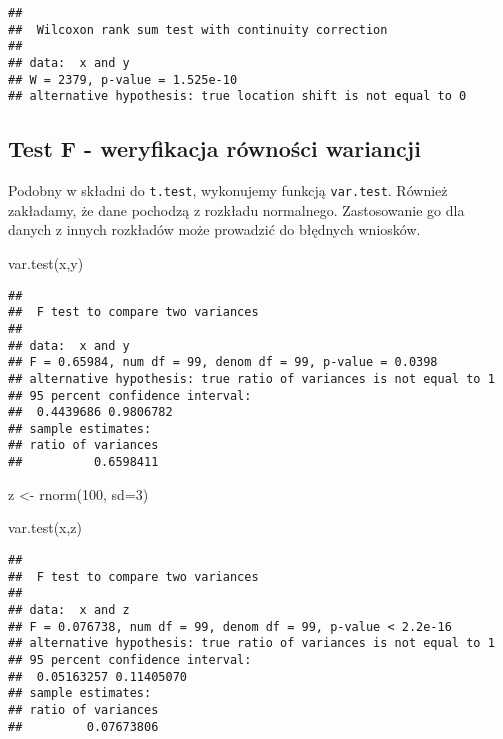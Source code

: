 \documentclass[
]{book}
\newenvironment{Shaded}{\begin{snugshade}}{\end{snugshade}}
\newcommand{\AttributeTok}[1]{\textcolor[rgb]{0.77,0.63,0.00}{#1}}
\newcommand{\DecValTok}[1]{\textcolor[rgb]{0.00,0.00,0.81}{#1}}
\newcommand{\FunctionTok}[1]{\textcolor[rgb]{0.00,0.00,0.00}{#1}}
\newcommand{\NormalTok}[1]{#1}
\newcommand{\OtherTok}[1]{\textcolor[rgb]{0.56,0.35,0.01}{#1}}
\begin{document}
\begin{verbatim}
## 
##  Wilcoxon rank sum test with continuity correction
## 
## data:  x and y
## W = 2379, p-value = 1.525e-10
## alternative hypothesis: true location shift is not equal to 0
\end{verbatim}

\hypertarget{test-f---weryfikacja-ruxf3wnoux15bci-wariancji}{%
\subsection{Test F - weryfikacja równości wariancji}\label{test-f---weryfikacja-ruxf3wnoux15bci-wariancji}}

Podobny w składni do \texttt{t.test}, wykonujemy funkcją \texttt{var.test}. Również zakładamy, że dane pochodzą z rozkładu normalnego. Zastosowanie go dla danych z innych rozkładów może prowadzić do błędnych wniosków.

\begin{Shaded}
\begin{Highlighting}[]
\FunctionTok{var.test}\NormalTok{(x,y)}
\end{Highlighting}
\end{Shaded}

\begin{verbatim}
## 
##  F test to compare two variances
## 
## data:  x and y
## F = 0.65984, num df = 99, denom df = 99, p-value = 0.0398
## alternative hypothesis: true ratio of variances is not equal to 1
## 95 percent confidence interval:
##  0.4439686 0.9806782
## sample estimates:
## ratio of variances 
##          0.6598411
\end{verbatim}

\begin{Shaded}
\begin{Highlighting}[]
\NormalTok{z }\OtherTok{\textless{}{-}} \FunctionTok{rnorm}\NormalTok{(}\DecValTok{100}\NormalTok{, }\AttributeTok{sd=}\DecValTok{3}\NormalTok{)}

\FunctionTok{var.test}\NormalTok{(x,z)}
\end{Highlighting}
\end{Shaded}

\begin{verbatim}
## 
##  F test to compare two variances
## 
## data:  x and z
## F = 0.076738, num df = 99, denom df = 99, p-value < 2.2e-16
## alternative hypothesis: true ratio of variances is not equal to 1
## 95 percent confidence interval:
##  0.05163257 0.11405070
## sample estimates:
## ratio of variances 
##         0.07673806
\end{verbatim}
\end{document}
